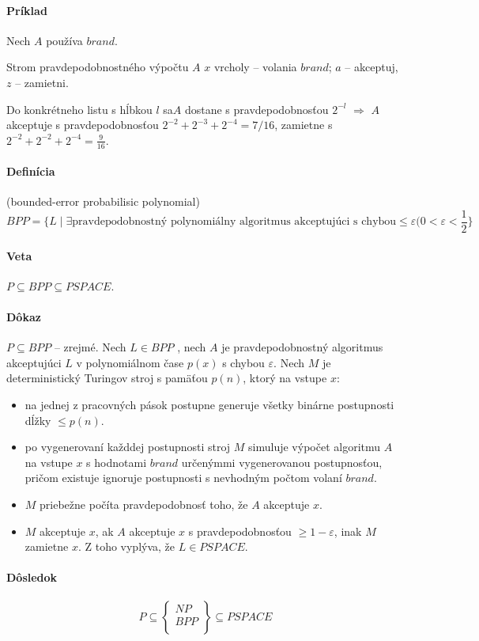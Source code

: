 \documentclass{article}
\begin{document}
\paragraph{Príklad} Nech $A$ používa $brand$.


Strom pravdepodobnostného výpočtu $A$ $x$ vrcholy -- volania $brand$; $a$ --
akceptuj, $z$ -- zamietni.

Do konkrétneho listu s hĺbkou $l$ sa$A$ dostane s pravdepodobnosťou $2^{-l}$
$\Rightarrow$ $A$ akceptuje s pravdepodobnosťou $2^{-2} + 2^{-3} + 2^{-4} =
7/16$, zamietne s $ 2^{-2} + 2^{-2} + 2^{-4}=\frac{9}{16}$.

\paragraph{Definícia} (bounded-error probabilisic polynomial) $$BPP = \{ L \mid
\exists \mbox{pravdepodobnostný polynomiálny algoritmus akceptujúci s chybou}
\leq \varepsilon (0<\varepsilon <\frac{1}{2}\}$$

\paragraph{Veta} $P \subseteq BPP \subseteq PSPACE$.
\paragraph{Dôkaz} $P \subseteq BPP$ -- zrejmé. Nech $L \in BPP$ , nech $A$ je
pravdepodobnostný algoritmus akceptujúci $L$ v polynomiálnom čase $p(x)$ s
chybou $\varepsilon$. Nech $M$ je deterministický Turingov stroj s pamäťou
$p(n)$, ktorý na vstupe $x$:
\begin{itemize}
	\item na jednej z pracovných pások postupne generuje všetky binárne
	postupnosti dĺžky $\leq p(n)$.
	\item po vygenerovaní každdej postupnosti stroj $M$ simuluje výpočet
	algoritmu $A$ na vstupe $x$ s hodnotami $brand$ určenýmmi vygenerovanou
	postupnosťou, pričom existuje ignoruje postupnosti s nevhodným počtom
	volaní $brand$.
	\item $M$ priebežne počíta pravdepodobnosť toho, že $A$ akceptuje $x$.
	\item $M$ akceptuje $x$, ak $A$ akceptuje $x$ s pravdepodobnosťou $\geq
	1 - \varepsilon$, inak $M$ zamietne $x$. Z toho vyplýva, že $L \in
	PSPACE$.
\end{itemize}

\paragraph{Dôsledok} $$P \subseteq \left\{ 
\begin{array}{l}
NP \\
BPP \\
\end{array}
\right\}
\subseteq PSPACE
$$
\end{document}
